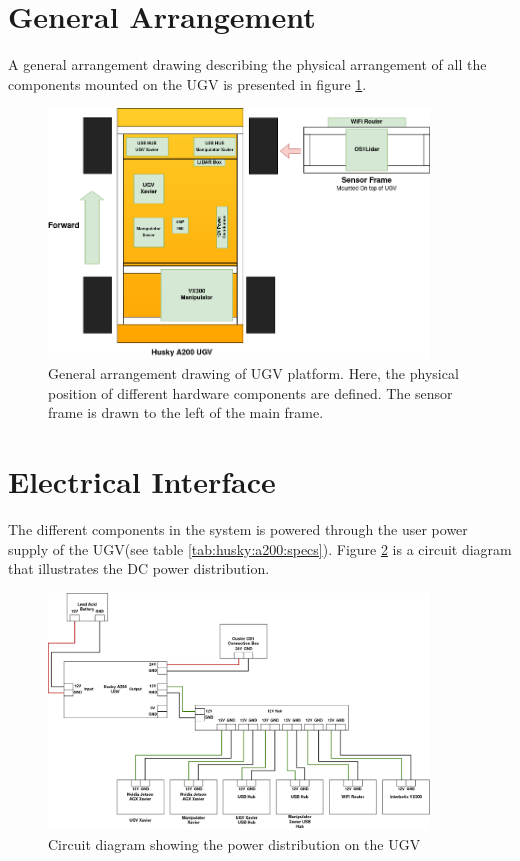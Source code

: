 \section{General Arrangement}\label{M:H:GeneralArrangement}
A general arrangement drawing describing the physical arrangement of all the components mounted on the UGV is presented in figure \ref{fig:general_arrangement}.

\begin{figure}[htp]
  \centering
   \includegraphics[width=0.9\textwidth]{Figures/general_arrangement.drawio.png}
  \caption{General arrangement drawing of UGV platform. Here, the physical position of different hardware components are defined. The sensor frame is drawn to the left of the main frame.}
  \label{fig:general_arrangement}
\end{figure}

\section{Electrical Interface}\label{A:ElectricalInterface}
The different components in the system is powered through the user power supply of the UGV(see table \ref{tab:husky:a200:specs}). Figure \ref{fig:circuit_diagram} is a circuit diagram that illustrates the DC power distribution.
\begin{figure}[htp]
  \centering
  \includegraphics[angle=-90, width = 0.9\textwidth]{Figures/circuit_diagram.drawio.png}
  \caption{Circuit diagram showing the power distribution on the UGV}
  \label{fig:circuit_diagram}
\end{figure}

